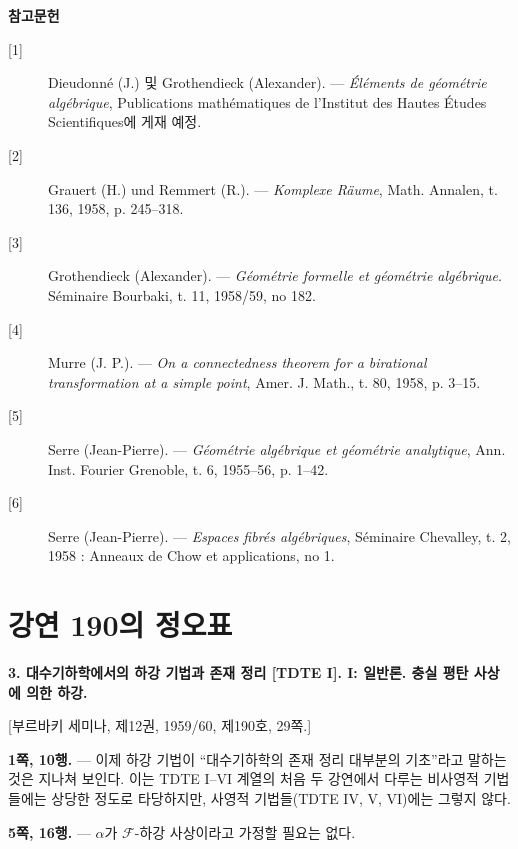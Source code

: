 \documentclass[11pt,twoside,openany]{book}
\numberwithin{equation}{section}
\newcommand{\sourceunit}{front}
\newcommand{\src}[1]{%
  \phantomsection\hypertarget{src:\sourceunit:#1}{}%
  \marginpar{\raggedleft\footnotesize\sffamily #1}%
}
\theoremstyle{plain}
\theoremstyle{definition}
\theoremstyle{remark}
\begin{document}
\src{327}
\begin{center}
  \textbf{참고문헌}
\end{center}

\begin{description}
  \item[{[1]}] Dieudonn\'e (J.) 및 Grothendieck (Alexander). --- \emph{Éléments
    de géométrie algébrique}, Publications mathématiques de l'Institut des
    Hautes Études Scientifiques에 게재 예정.
  \item[{[2]}] Grauert (H.) und Remmert (R.). --- \emph{Komplexe Räume}, Math.
    Annalen, t. 136, 1958, p. 245--318.
  \item[{[3]}] Grothendieck (Alexander). --- \emph{Géométrie formelle et
    géométrie algébrique}. Séminaire Bourbaki, t. 11, 1958/59, no 182.
  \item[{[4]}] Murre (J. P.). --- \emph{On a connectedness theorem for a
    birational transformation at a simple point}, Amer. J. Math., t. 80, 1958,
    p. 3--15.
  \item[{[5]}] Serre (Jean-Pierre). --- \emph{Géométrie algébrique et géométrie
    analytique}, Ann. Inst. Fourier Grenoble, t. 6, 1955--56, p. 1--42.
  \item[{[6]}] Serre (Jean-Pierre). --- \emph{Espaces fibrés algébriques},
    Séminaire Chevalley, t. 2, 1958 : Anneaux de Chow et applications, no 1.
\end{description}


\par
\renewcommand{\sourceunit}{e190}
\clearpage
\chapter*{강연 190의 정오표}
\setcounter{footnote}{0}
\src{300}

\noindent\textbf{3. 대수기하학에서의 하강 기법과 존재 정리
[TDTE I]. I: 일반론. 충실 평탄 사상에 의한 하강.}

\begin{center}
[부르바키 세미나, 제12권, 1959/60, 제190호, 29쪽.]
\end{center}

\noindent\textbf{1쪽, 10행.} --- 이제 하강 기법이 ``대수기하학의
존재 정리 대부분의 기초''라고 말하는 것은 지나쳐 보인다. 이는 TDTE
I--VI 계열의 처음 두 강연에서 다루는 비사영적 기법들에는 상당한
정도로 타당하지만, 사영적 기법들(TDTE IV, V, VI)에는 그렇지 않다.

\noindent\textbf{5쪽, 16행.} --- $\alpha$가 $\mathcal F$-하강 사상이라고
가정할 필요는 없다.
\end{document}
